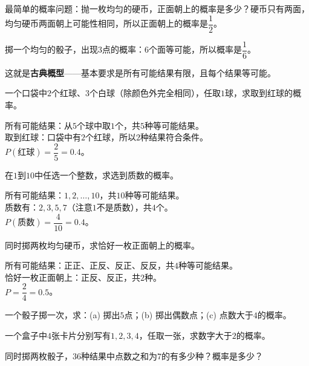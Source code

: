 
最简单的概率问题：抛一枚均匀的硬币，正面朝上的概率是多少？硬币只有两面，均匀硬币两面朝上可能性相同，所以正面朝上的概率是$\dfrac12$。

掷一个均匀的骰子，出现$3$点的概率：$6$个面等可能，所以概率是$\dfrac16$。

这就是\textbf{古典概型}——基本要求是所有可能结果有限，且每个结果等可能。


\begin{example}
一个口袋中$2$个红球、$3$个白球（除颜色外完全相同），任取$1$球，求取到红球的概率。
\end{example}
\begin{solution}
所有可能结果：从$5$个球中取$1$个，共$5$种等可能结果。\\
取到红球：口袋中有$2$个红球，所以$2$种结果符合条件。\\
$P(\text{红球})=\dfrac{2}{5}=0.4$。
\end{solution}

\begin{example}
在$1$到$10$中任选一个整数，求选到质数的概率。
\end{example}
\begin{solution}
所有可能结果：$1,2,\dots,10$，共$10$种等可能结果。\\
质数有：$2,3,5,7$（注意$1$不是质数），共$4$个。\\
$P(\text{质数})=\dfrac{4}{10}=0.4$。
\end{solution}

\begin{example}
同时掷两枚均匀硬币，求恰好一枚正面朝上的概率。
\end{example}
\begin{solution}
所有可能结果：正正、正反、反正、反反，共$4$种等可能结果。\\
恰好一枚正面朝上：正反、反正，共$2$种。\\
$P=\dfrac{2}{4}=0.5$。
\end{solution}

\begin{exercise}
\item 一个骰子掷一次，求：(a) 掷出$5$点；(b) 掷出偶数点；(c) 点数大于$4$的概率。
\item 一个盒子中$4$张卡片分别写有$1,2,3,4$，任取一张，求数字大于$2$的概率。
\item 同时掷两枚骰子，$36$种结果中点数之和为$7$的有多少种？概率是多少？
\end{exercise}

